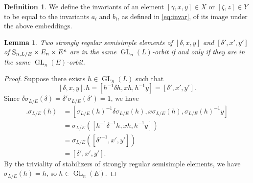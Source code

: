 \documentclass[11pt, reqno]{amsart}
\numberwithin{equation}{subsection}
\theoremstyle{plain}
\newtheorem{lem}[proposition]{Lemma}
\theoremstyle{definition}
\newtheorem{definition}[proposition]{Definition}
\renewcommand{\S}{\textnormal{S}}
\DeclareMathOperator{\GL}{GL}
\begin{document}
\begin{definition}
We define the invariants of an element
$[\gamma, x, y] \in X$ or $[\zeta, z] \in Y$
to be equal to the invariants $a_i$ and $b_i$,
as defined in \eqref{eq:invar}, of
its image under the above embeddings.
\end{definition}

\begin{lem}
\label{lem:sv}
Two strongly regular semisimple elements of $[\delta, x, y]$ and
$[\delta', x', y']$ of $\S_{n, L/E} \times E_n
\times E^n$ are in the same $\GL_n(L)$-orbit
if and only if they are in the same $\GL_n(E)$-orbit.
\end{lem}
\begin{proof}
Suppose there exists $h \in \GL_n(L)$ such that
\[
    [\delta, x, y].h = [h^{-1}\delta h, xh, h^{-1} y]
    = [\delta', x', y'].
\]
Since $\delta \sigma_{L/E}(\delta) 
= \delta'\sigma_{L/E}(\delta') = 1$, we have
\begin{align*}
    [\delta, x, y].\sigma_{L/E}(h) 
    &= [\sigma_{L/E}(h)^{-1} \delta \sigma_{L/E}(h), x\sigma_{L/E}(h),
    \sigma_{L/E}(h)^{-1}y]\\
    &= \sigma_{L/E}([h^{-1}\delta^{-1} h, xh, h^{-1}y])\\
    &= \sigma_{L/E}([\delta'^{-1}, x', y']) \\
    &= [\delta', x', y'].
\end{align*}
By the triviality of stabilizers of strongly
regular semisimple elements, we have 
$\sigma_{L/E}(h) = h$, so $h \in \GL_n(E)$.
\end{proof}
\end{document}
